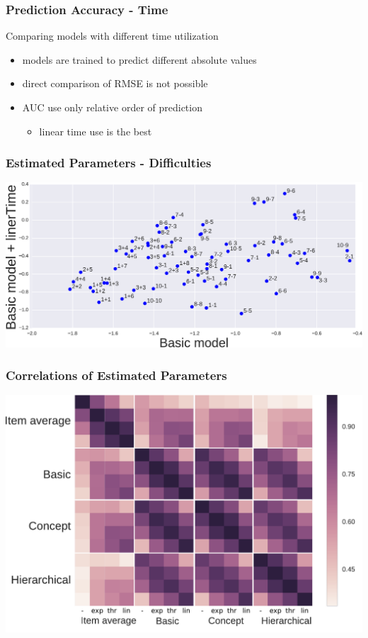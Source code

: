 \documentclass[xcolor=svgnames]{beamer}
\begin{document}
\begin{frame}
    \frametitle{Prediction Accuracy - Time}

    Comparing models with different time utilization
    \begin{itemize}
        \item models are trained to predict different absolute values
        \item direct comparison of RMSE is not possible
        \item AUC use only relative order of prediction
            \begin{itemize}
            \item linear time use is the best
            \end{itemize}
    \end{itemize}
\end{frame}
\begin{frame}
    \frametitle{Estimated Parameters - Difficulties}

    \includegraphics[width=\linewidth]{figures/difficulties-one-color}
\end{frame}
\begin{frame}
    \frametitle{Correlations of Estimated Parameters}
    \includegraphics[width=\linewidth]{figures/difficulty-correlations}
\end{frame}
\end{document}
